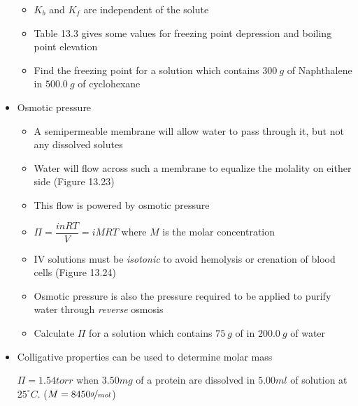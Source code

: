 \documentclass[12pt, openany, letterpaper]{memoir}
\begin{document}
\begin{itemize}
\begin{itemize}
		\item $K_b$ and $K_f$ are independent of the solute
		\item Table 13.3 gives some values for freezing point depression and boiling point elevation
		\item Find the freezing point for a solution which contains $300~g$ of Naphthalene in $500.0~g$ of cyclohexane
	\end{itemize}
	\item Osmotic pressure
	\begin{itemize}
		\item A semipermeable membrane will allow water to pass through it, but not any dissolved solutes
		\item Water will flow across such a membrane to equalize the molality on either side (Figure 13.23)
		\item This flow is powered by osmotic pressure
		\item $\Pi = \dfrac{inRT}{V}=iMRT$ where $M$ is the molar concentration
		\item IV solutions must be \emph{isotonic} to avoid hemolysis or crenation of blood cells (Figure 13.24)
    \item Osmotic pressure is also the pressure required to be applied to purify water through \emph{reverse} osmosis
		\item Calculate $\Pi$ for a solution which contains $75~g$ of  in $200.0~g$ of water
	\end{itemize}
  \item Colligative properties can be used to determine molar mass

        $\Pi=1.54 torr$ when $3.50mg$ of a protein are dissolved in $5.00ml$ of solution at $25^\circ C$. ($M=8450\nicefrac{g}{mol}$)
\end{itemize}
\end{document}

